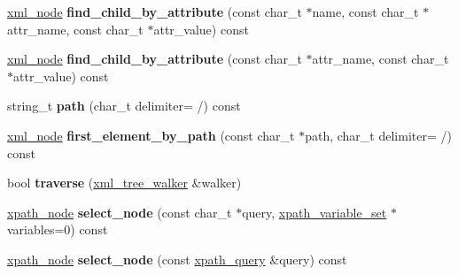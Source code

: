 \begin{DoxyCompactItemize}
\item 
\hypertarget{classpugi_1_1xml__node_adcbe6392a84e4d156cca69c8ec3224da}{}\hyperlink{classpugi_1_1xml__node}{xml\+\_\+node} {\bfseries find\+\_\+child\+\_\+by\+\_\+attribute} (const char\+\_\+t $\ast$name, const char\+\_\+t $\ast$attr\+\_\+name, const char\+\_\+t $\ast$attr\+\_\+value) const \label{classpugi_1_1xml__node_adcbe6392a84e4d156cca69c8ec3224da}

\item 
\hypertarget{classpugi_1_1xml__node_a96377b213e80a99cc21db911610b88e0}{}\hyperlink{classpugi_1_1xml__node}{xml\+\_\+node} {\bfseries find\+\_\+child\+\_\+by\+\_\+attribute} (const char\+\_\+t $\ast$attr\+\_\+name, const char\+\_\+t $\ast$attr\+\_\+value) const \label{classpugi_1_1xml__node_a96377b213e80a99cc21db911610b88e0}

\item 
\hypertarget{classpugi_1_1xml__node_ae5694be88058346ad8e6e418410d4979}{}string\+\_\+t {\bfseries path} (char\+\_\+t delimiter= \textquotesingle{}/\textquotesingle{}) const \label{classpugi_1_1xml__node_ae5694be88058346ad8e6e418410d4979}

\item 
\hypertarget{classpugi_1_1xml__node_ae701cc3920f4a779610f94219bb41fe1}{}\hyperlink{classpugi_1_1xml__node}{xml\+\_\+node} {\bfseries first\+\_\+element\+\_\+by\+\_\+path} (const char\+\_\+t $\ast$path, char\+\_\+t delimiter= \textquotesingle{}/\textquotesingle{}) const \label{classpugi_1_1xml__node_ae701cc3920f4a779610f94219bb41fe1}

\item 
\hypertarget{classpugi_1_1xml__node_a951d5d02987f75fabc4d575cfdeec8b4}{}bool {\bfseries traverse} (\hyperlink{classpugi_1_1xml__tree__walker}{xml\+\_\+tree\+\_\+walker} \&walker)\label{classpugi_1_1xml__node_a951d5d02987f75fabc4d575cfdeec8b4}

\item 
\hypertarget{classpugi_1_1xml__node_a87dc7d267f7aab02865c3f7a9705ad82}{}\hyperlink{classpugi_1_1xpath__node}{xpath\+\_\+node} {\bfseries select\+\_\+node} (const char\+\_\+t $\ast$query, \hyperlink{classpugi_1_1xpath__variable__set}{xpath\+\_\+variable\+\_\+set} $\ast$variables=0) const \label{classpugi_1_1xml__node_a87dc7d267f7aab02865c3f7a9705ad82}

\item 
\hypertarget{classpugi_1_1xml__node_ac1e3f0f7635461031ea1ee5b63a4993c}{}\hyperlink{classpugi_1_1xpath__node}{xpath\+\_\+node} {\bfseries select\+\_\+node} (const \hyperlink{classpugi_1_1xpath__query}{xpath\+\_\+query} \&query) const \label{classpugi_1_1xml__node_ac1e3f0f7635461031ea1ee5b63a4993c}


\end{DoxyCompactItemize}

